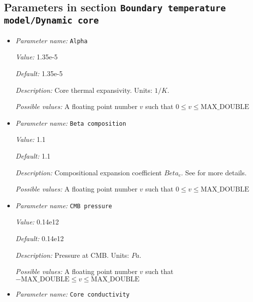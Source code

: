 \subsection{Parameters in section \tt Boundary temperature model/Dynamic core}
\label{parameters:Boundary_20temperature_20model/Dynamic_20core}

\begin{itemize}
\item {\it Parameter name:} {\tt Alpha}
\label{parameters:Boundary temperature model/Dynamic core/Alpha}
\label{parameters:Boundary_20temperature_20model/Dynamic_20core/Alpha}


{\it Value:} 1.35e-5


{\it Default:} 1.35e-5


{\it Description:} Core thermal expansivity. Units: $1/K$.


{\it Possible values:} A floating point number $v$ such that $0 \leq v \leq \text{MAX\_DOUBLE}$
\item {\it Parameter name:} {\tt Beta composition}
\label{parameters:Boundary temperature model/Dynamic core/Beta composition}
\label{parameters:Boundary_20temperature_20model/Dynamic_20core/Beta_20composition}


{\it Value:} 1.1


{\it Default:} 1.1


{\it Description:} Compositional expansion coefficient $Beta_c$. See \cite{NPB+04} for more details.


{\it Possible values:} A floating point number $v$ such that $0 \leq v \leq \text{MAX\_DOUBLE}$
\item {\it Parameter name:} {\tt CMB pressure}
\label{parameters:Boundary temperature model/Dynamic core/CMB pressure}
\label{parameters:Boundary_20temperature_20model/Dynamic_20core/CMB_20pressure}


{\it Value:} 0.14e12


{\it Default:} 0.14e12


{\it Description:} Pressure at CMB. Units: $Pa$.


{\it Possible values:} A floating point number $v$ such that $-\text{MAX\_DOUBLE} \leq v \leq \text{MAX\_DOUBLE}$
\item {\it Parameter name:} {\tt Core conductivity}
\label{parameters:Boundary temperature model/Dynamic core/Core conductivity}
\label{parameters:Boundary_20temperature_20model/Dynamic_20core/Core_20conductivity}



\end{itemize}
